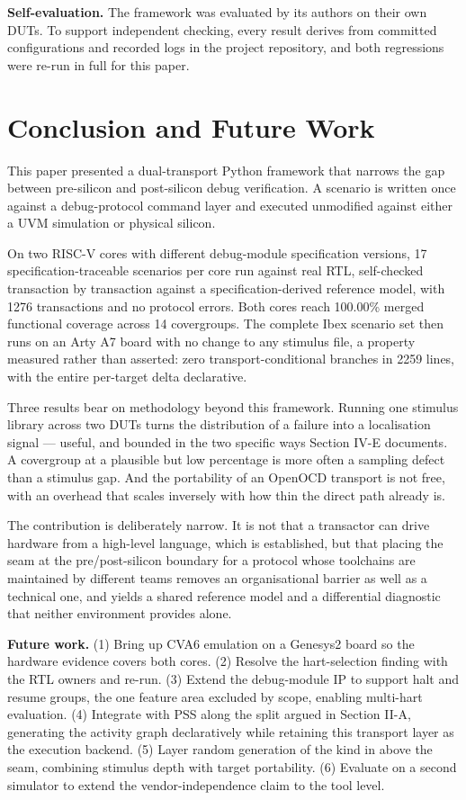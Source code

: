 \documentclass[conference]{IEEEtran}
\begin{document}
\textbf{Self-evaluation.} The framework was evaluated by its authors on their own DUTs. To support independent checking, every result derives from committed configurations and recorded logs in the project repository, and both regressions were re-run in full for this paper.

\section{Conclusion and Future Work}
This paper presented a dual-transport Python framework that narrows the gap between pre-silicon and post-silicon debug verification. A scenario is written once against a debug-protocol command layer and executed unmodified against either a UVM simulation or physical silicon.

On two RISC-V cores with different debug-module specification versions, 17 specification-traceable scenarios per core run against real RTL, self-checked transaction by transaction against a specification-derived reference model, with 1276 transactions and no protocol errors. Both cores reach 100.00\% merged functional coverage across 14 covergroups. The complete Ibex scenario set then runs on an Arty A7 board with no change to any stimulus file, a property measured rather than asserted: zero transport-conditional branches in 2259 lines, with the entire per-target delta declarative.

Three results bear on methodology beyond this framework. Running one stimulus library across two DUTs turns the distribution of a failure into a localisation signal --- useful, and bounded in the two specific ways Section IV-E documents. A covergroup at a plausible but low percentage is more often a sampling defect than a stimulus gap. And the portability of an OpenOCD transport is not free, with an overhead that scales inversely with how thin the direct path already is.

The contribution is deliberately narrow. It is not that a transactor can drive hardware from a high-level language, which is established, but that placing the seam at the pre/post-silicon boundary for a protocol whose toolchains are maintained by different teams removes an organisational barrier as well as a technical one, and yields a shared reference model and a differential diagnostic that neither environment provides alone.

\textbf{Future work.} (1) Bring up CVA6 emulation on a Genesys2 board so the hardware evidence covers both cores. (2) Resolve the hart-selection finding with the RTL owners and re-run. (3) Extend the debug-module IP to support halt and resume groups, the one feature area excluded by scope, enabling multi-hart evaluation. (4) Integrate with PSS along the split argued in Section II-A, generating the activity graph declaratively while retaining this transport layer as the execution backend. (5) Layer random generation of the kind in \cite{b2} above the seam, combining stimulus depth with target portability. (6) Evaluate on a second simulator to extend the vendor-independence claim to the tool level.
\end{document}
